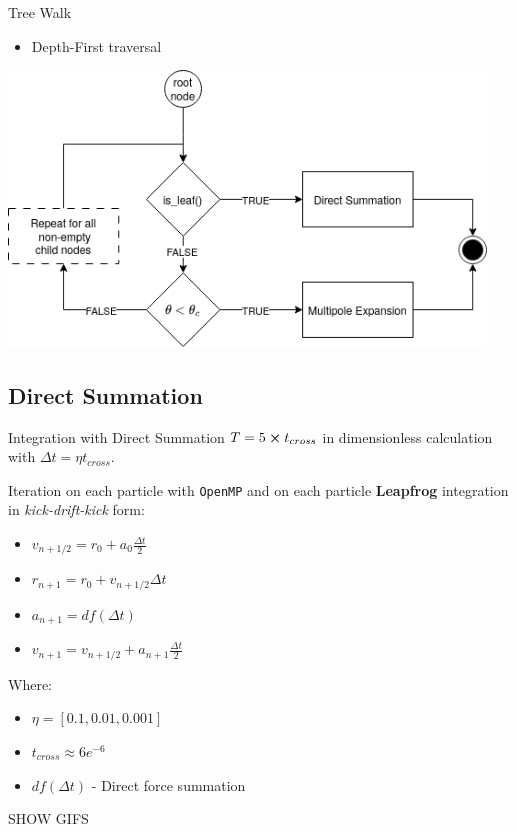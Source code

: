 \begin{frame}{Tree Walk}
	\begin{itemize}
		\item Depth-First traversal
	\end{itemize}
	\includegraphics[width=0.95\textwidth]{figures/multipole_uml.png}
\end{frame}

\subsection{Direct Summation}
\begin{frame}{Integration with Direct Summation}
	$T = 5 \cross t_{cross}$ in dimensionless calculation with $\Delta t = \eta t_{cross}$. \bigskip

	Iteration on each particle with \texttt{OpenMP} and on each particle \textbf{Leapfrog} integration in \textit{kick-drift-kick} form:
	\begin{itemize}
		\item $v_{n+1/2} = r_0 + a_0  \frac{\Delta t}{2}$
		\item $r_{n+1} = r_0 + v_{n+1/2} \Delta t$
		\item $a_{n+1} = df(\Delta t)$
		\item $v_{n+1} = v_{n+1/2} + a_{n+1} \frac{\Delta t}{2}$
	\end{itemize} \bigskip

	{\footnotesize Where:
		\begin{itemize}
			\item $\eta = [0.1, 0.01, 0.001]$
			\item $t_{cross} \approx 6e^{-6}$
			\item $df(\Delta t)$ - Direct force summation
		\end{itemize}
	}

	\bigskip\centering
	SHOW GIFS

\end{frame}


